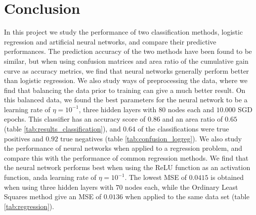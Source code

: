 \section{Conclusion}\label{sec:Conclusion}
In this project we study the performance of two classification methods, logistic regression and artificial neural networks, and compare their predictive performances. The prediction accuracy of the two methods have been found to be similar, but when using confusion matrices and area ratio of the cumulative gain curve as accuracy metrics, we find that neural networks generally perform better than logistic regression. We also study ways of preprocessing the data, where we find that balancing the data prior to training can give a much better result. On this balanced data, we found the best parameters for the neural network to be a learning rate of $\eta=10^{-1}$, three hidden layers with $80$ nodes each and $10.000$ SGD epochs. This classifier has an accuracy score of $0.86$ and an area ratio of $0.65$ (table \ref{tab:results_classification}), and $0.64$ of the classifications were true positives and $0.92$ true negatives (table \ref{tab:confusion_logreg}). We also study the performance of neural networks when applied to a regression problem, and compare this with the performance of common regression methods. We find that the neural network performs best when using the ReLU function as an activation function, anda learning rate of $\eta=10^{-1}$. The lowest MSE of $0.0415$ is obtained when using three hidden layers with $70$ nodes each, while the Ordinary Least Squares method give an MSE of $0.0136$ when applied to the same data set (table \ref{tab:regression}).
